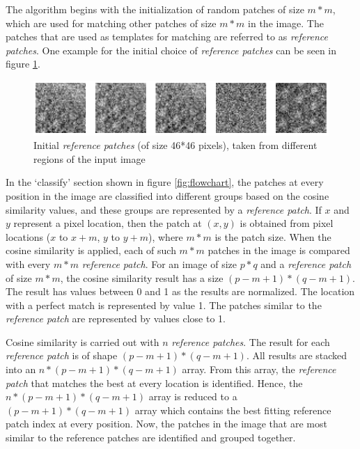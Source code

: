 \documentclass[fleqn,10pt]{wlscirep}
\begin{document}
The algorithm begins with the initialization of random patches of size $m*m$, which are used for matching other patches of size $m*m$ in the image. The patches that are used as templates for matching are referred to as \textit{reference patches}. One example for the initial choice of \textit{reference patches} can be seen in figure \ref{fig:initial_reference_patches}. 

\begin{figure}
	\centering
	\includegraphics[scale=0.75]{./imgs/initial_reference_patches.png}
	\caption[Initial \textit{reference patches}]{Initial \textit{reference patches} (of size 46*46 pixels), taken from different regions of the input image}
	\label{fig:initial_reference_patches}
\end{figure} 

In the `classify'  section shown in figure \ref{fig:flowchart}, the patches at every position in the image are classified into different groups based on the cosine similarity values, and these groups are represented by a \textit{reference patch}. If $x$ and $y$ represent a pixel location, then the patch at $(x, y)$ is obtained from pixel locations ($x$ to $x + m$, $y$ to $y + m$), where $m*m$ is the patch size. When the cosine similarity is applied, each of such $m*m$ patches in the image is compared with every $m*m$ \textit{reference patch}. For an image of size $p*q$ and a \textit{reference patch} of size $m*m$, the cosine similarity result has a size $(p - m + 1)*(q - m + 1)$. The result has values between 0 and 1 as the results are normalized. The location with a perfect match is represented by value 1. The patches similar to the \textit{reference patch} are represented by values close to 1. 

Cosine similarity is carried out with $n$ \textit{reference patches}. The result for each \textit{reference patch} is of shape $(p - m + 1)*(q - m + 1)$. All results are stacked into an $n * (p - m + 1)*(q - m + 1)$ array. From this array, the \textit{reference patch} that matches the best at every location is identified. Hence, the $n * (p - m + 1)*(q - m + 1)$ array is reduced to a  $(p - m + 1)*(q - m + 1)$ array which contains the best fitting reference patch index at every position. Now, the patches in the image that are most similar to the reference patches are identified  and grouped together.   
\end{document}
